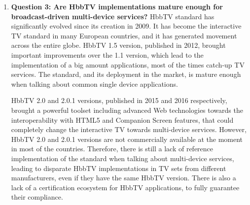 \begin{enumerate}
	\item \textbf{Question 3: Are HbbTV implementations mature enough for broadcast-driven multi-device services?} HbbTV standard has significantly evolved since its creation in 2009. It has become the interactive TV standard in many European countries, and it has generated movement across the entire globe. HbbTV 1.5 version, published in 2012, brought important improvements over the 1.1 version, which lead to the implementation of a big amount applications, most of the times catch-up TV services. The standard, and its deployment in the market, is mature enough when talking about common single device applications.
	
	HbbTV 2.0 and 2.0.1 versions, published in 2015 and 2016 respectively, brought a powerful toolset including advanced Web technologies towards the interoperability with HTML5 and Companion Screen features, that could completely change the interactive TV towards multi-device services. However, HbbTV 2.0 and 2.0.1 versions are not commercially available at the moment in most of the countries. Therefore, there is still a lack of reference implementation of the standard when talking about multi-device services, leading to disparate HbbTV implementations in TV sets from different manufacturers, even if they have the same HbbTV version. There is also a lack of a certification ecosystem for HbbTV applications, to fully guarantee their compliance.
	

\end{enumerate}
